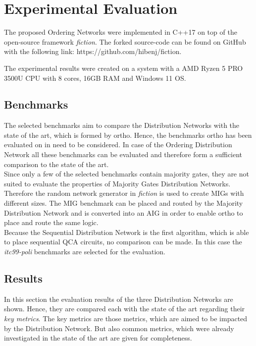 \chapter{Experimental Evaluation}\label{chapter:ExpEval}

The proposed Ordering Networks were implemented in C++17 on top of the open-source framework \textit{fiction}. The forked source-code can be found on GitHub with the following link: https://github.com/hibenj/fiction. 

The experimental results were created on a system with a AMD Ryzen 5 PRO 3500U CPU with 8 cores, 16GB RAM and Windows 11 OS.

\section{Benchmarks}
The selected benchmarks aim to compare the Distribution Networks with the state of the art, which is formed by ortho. Hence, the benchmarks \cite{fontes, trindade2016placement, epfl, iscas} ortho has been evaluated on in \cite{ortho} need to be considered. In case of the Ordering Distribution Network all these benchmarks can be evaluated and therefore form a sufficient comparison to the state of the art.\\
Since only a few of the selected benchmarks contain majority gates, they are not suited to evaluate the properties of Majority Gates Distribution Networks. Therefore the random network generator in \textit{fiction} is used to create MIGs with different sizes. The MIG benchmark can be placed and routed by the Majority Distribution Network and is converted into an AIG in order to enable ortho to place and route the same logic.\\
Because the Sequential Distribution Network is the first algorithm, which is able to place sequential QCA circuits, no comparison can be made. In this case the \textit{itc99-poli} \cite{itc_poli} benchmarks are selected for the evaluation.

\section{Results}
In this section the evaluation results of the three Distribution Networks are shown. Hence, they are compared each with the state of the art regarding their \textit{key metrics}. The key metrics are those metrics, which are aimed to be impacted by the Distribution Network. But also common metrics, which were already investigated in the state of the art are given for completeness.

